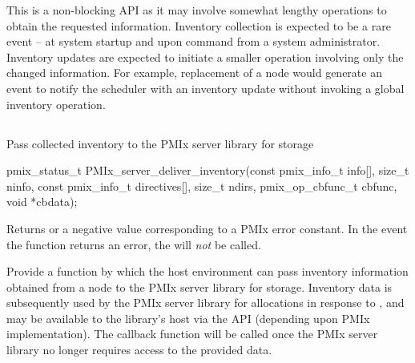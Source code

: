 \advicermstart
This is a non-blocking \ac{API} as it may involve somewhat lengthy operations to obtain the requested information. Inventory collection is expected to be a rare event – at system startup and upon command from a system administrator. Inventory updates are expected to initiate a smaller operation involving only the changed information. For example, replacement of a node would generate an event to notify the scheduler with an inventory update without invoking a global inventory operation.
\advicermend

\subsection{}

\summary

Pass collected inventory to the \ac{PMIx} server library for storage

\format

\cspecificstart
\begin{codepar}
pmix_status_t
PMIx_server_deliver_inventory(const pmix_info_t info[],
                              size_t ninfo,
                              const pmix_info_t directives[],
                              size_t ndirs,
                              pmix_op_cbfunc_t cbfunc,
                              void *cbdata);
\end{codepar}
\cspecificend

\begin{arglist}
\end{arglist}

Returns  or a negative value corresponding to a PMIx error constant. In the event the function returns an error, the  will \textit{not} be called.

\descr

Provide a function by which the host environment can pass inventory information obtained from a node to the \ac{PMIx} server library for storage. Inventory data is subsequently used by the \ac{PMIx} server library for allocations in response to , and may be available to the library's host via the  \ac{API} (depending upon \ac{PMIx} implementation). The  callback function will be called once the \ac{PMIx} server library no longer requires access to the provided data.

